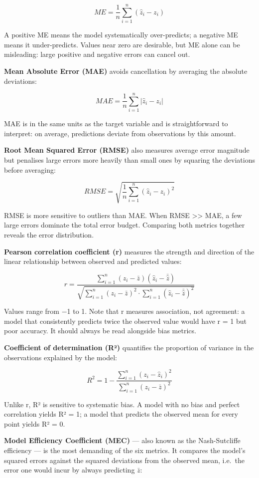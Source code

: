 \documentclass[
  10pt,
  b5paper,
  oneside]{book}
\begin{document}
\[ME = \frac{1}{n}\sum_{i=1}^{n}(\hat{z}_i - z_i)\]

A positive ME means the model systematically over-predicts; a negative ME means it under-predicts. Values near zero are desirable, but ME alone can be misleading: large positive and negative errors can cancel out.

\textbf{Mean Absolute Error (MAE)} avoids cancellation by averaging the absolute deviations:

\[MAE = \frac{1}{n}\sum_{i=1}^{n}|\hat{z}_i - z_i|\]

MAE is in the same units as the target variable and is straightforward to interpret: on average, predictions deviate from observations by this amount.

\textbf{Root Mean Squared Error (RMSE)} also measures average error magnitude but penalises large errors more heavily than small ones by squaring the deviations before averaging:

\[RMSE = \sqrt{\frac{1}{n}\sum_{i=1}^{n}(\hat{z}_i - z_i)^2}\]

RMSE is more sensitive to outliers than MAE. When RMSE \textgreater\textgreater{} MAE, a few large errors dominate the total error budget. Comparing both metrics together reveals the error distribution.

\textbf{Pearson correlation coefficient (r)} measures the strength and direction of the linear relationship between observed and predicted values:

\[r = \frac{\sum_{i=1}^{n}(z_i - \bar{z})(\hat{z}_i - \bar{\hat{z}})}{\sqrt{\sum_{i=1}^{n}(z_i - \bar{z})^2 \cdot \sum_{i=1}^{n}(\hat{z}_i - \bar{\hat{z}})^2}}\]

Values range from −1 to 1. Note that r measures association, not agreement: a model that consistently predicts twice the observed value would have r = 1 but poor accuracy. It should always be read alongside bias metrics.

\textbf{Coefficient of determination (R²)} quantifies the proportion of variance in the observations explained by the model:

\[R^2 = 1 - \frac{\sum_{i=1}^{n}(z_i - \hat{z}_i)^2}{\sum_{i=1}^{n}(z_i - \bar{z})^2}\]

Unlike r, R² is sensitive to systematic bias. A model with no bias and perfect correlation yields R² = 1; a model that predicts the observed mean for every point yields R² = 0.

\textbf{Model Efficiency Coefficient (MEC)} --- also known as the Nash-Sutcliffe efficiency --- is the most demanding of the six metrics. It compares the model's squared errors against the squared deviations from the observed mean, i.e.~the error one would incur by always predicting \(\bar{z}\):
\end{document}
